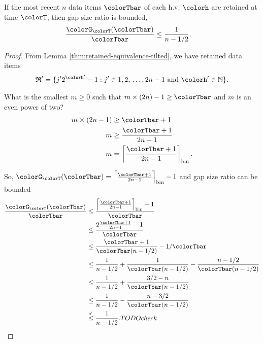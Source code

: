 \begin{lemma}
\label{thm:gap-size-ratio-tilted}
If the most recent $n$ data items $\colorTbar$ of each h.v. $\colorh$ are retained at time $\colorT$, then gap size ratio is bounded,
\begin{align*}
\frac{\colorG_{\colorT}(\colorTbar)}{\colorTbar}
&\leq
\frac{1}{n - 1/2}.
\end{align*}
\end{lemma}
\begin{proof}

From Lemma \ref{thm:retained-equivalence-tilted}, we have retained data items
\begin{align*}
\mathfrak{R}' =
\{
  j'2^{\colorh'} - 1
  :
  j' \in 1,2,\,\ldots,2n - 1
  \text{ and }
  \colorh' \in \mathbb{N}
\}.
\end{align*}


What is the smallest $m \geq 0$ such that $m \times (2n) - 1 \geq \colorTbar$ and $m$ is an even power of two?
\begin{align*}
m \times (2n - 1)
&\geq \colorTbar + 1\\
m
&\geq \frac{\colorTbar + 1}{2n - 1}\\
m
&= \left\lceil \frac{\colorTbar + 1 }{2n - 1} \right\rceil_{\mathrm{bin}}.
\end{align*}

So, $\colorG_{\colorT}(\colorTbar) = \left\lceil \frac{\colorTbar + 1 }{2n - 1} \right\rceil_{\mathrm{bin}} - 1$ and gap size ratio can be bounded
\begin{align*}
\frac{\colorG_{\colorT}(\colorTbar)}{\colorTbar}
&\leq
\frac{
\left\lceil \frac{\colorTbar + 1 }{2n - 1} \right\rceil_{\mathrm{bin}} - 1
}{
\colorTbar
}\\
&\leq
\frac{
2\frac{\colorTbar + 1}{2n - 1} - 1
}{
\colorTbar
}\\
&\leq
\frac{\colorTbar + 1}{\colorTbar(n - 1/2)} - 1/\colorTbar\\
&\leq
\frac{1}{n - 1/2} + \frac{1}{\colorTbar(n - 1/2)} - \frac{n - 1/2}{\colorTbar(n - 1/2)}\\
&\leq
\frac{1}{n - 1/2} + \frac{3/2 - n}{\colorTbar(n - 1/2)}\\
&\leq
\frac{1}{n - 1/2} - \frac{n - 3/2}{\colorTbar(n - 1/2)}\\
&\stackrel{\checkmark}{\leq}
\frac{1}{n - 1/2}. TODO check
\end{align*}

\end{proof}
